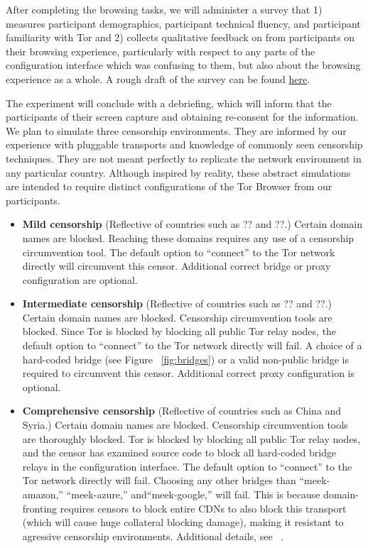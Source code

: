 \documentclass{template}
\begin{document}
After completing the browsing tasks, we will administer a survey that 1)
measures participant demographics, participant technical fluency, and
participant familiarity with Tor and 2) collects qualitative feedback on from
participants on their browsing experience, particularly with respect to any
parts of the configuration interface which was confusing to them, but also
about the browsing experience as a whole.  A rough draft of the survey can be
found
\href{http://www.surveygizmo.com/collab/2085559/Tor-Usability-Survey}{here}.

The experiment will conclude with a debriefing, which will inform that the
participants of their screen capture and obtaining re-consent for the
information.  \\

We plan to simulate three censorship environments.
They are informed by our experience with pluggable transports
and knowledge of commonly seen censorship techniques.
They are not meant perfectly to replicate the network environment
in any particular country. Although inspired by reality, these
abstract simulations are intended to require distinct configurations
of the Tor Browser from our participants. 

\begin{itemize} \itemsep1pt \parskip0pt 
\item {\bfseries Mild censorship} 
(Reflective of countries such as {\color{red}?? and ??}.)
Certain domain names are blocked. Reaching these 
domains requires any use of a censorship circumvention 
tool. The default option to ``connect'' to the Tor network 
directly will circumvent this censor. Additional correct
bridge or proxy configuration are optional. 
\item {\bfseries Intermediate censorship} 
(Reflective of countries such as {\color{red}?? and ??}.)
Certain domain names are blocked. Censorship circumvention
tools are blocked. Since Tor is blocked by blocking all public Tor
relay nodes, the default option to ``connect'' to the Tor network
directly will fail. A choice of a hard-coded bridge (see Figure ~\ref{fig:bridges})
or a valid non-public bridge is required to circumvent this censor.  
Additional correct proxy configuration is optional.
\item {\bfseries Comprehensive censorship} 
(Reflective of countries such as China and Syria.)
Certain domain names are blocked. Censorship circumvention tools
are thoroughly blocked. Tor is blocked by blocking all public
Tor relay nodes, and the censor has examined source code to block
all hard-coded bridge relays in the configuration interface. The default option
to ``connect'' to the Tor network directly will fail. Choosing any other bridges than
``meek-amazon,'' ``meek-azure,'' and``meek-google,'' will fail. This is because 
domain-fronting requires censors to block entire CDNs to also block this
transport (which will cause huge collateral blocking damage), making it resistant to agressive censorship environments. Additional details,
see ~\cite{fifield2015blocking}.\\
\end{itemize}
\end{document}
